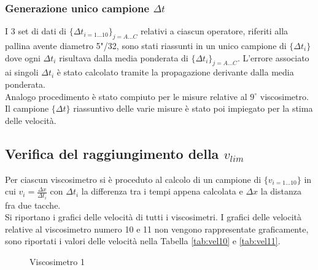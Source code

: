 \documentclass[a4paper,11pt,oneside]{article}
\begin{document}
\subsubsection*{Generazione unico campione $\Delta t$}
I 3 set di dati di $\{\Delta t_{i=1\dots10}\}_{j=A \dots C}$ relativi a ciascun operatore, riferiti alla pallina avente diametro 5"/32, sono stati riassunti in un unico campione di $\{\Delta t_{i}\}$ dove ogni $\Delta t_{i}$ risultava dalla media ponderata di $\{\Delta t_{i}\}_{j=A \dots C}$. L'errore associato ai singoli ${\Delta t_{i}}$ è stato calcolato tramite la propagazione derivante dalla media ponderata.\\

Analogo procedimento è stato compiuto per le misure relative al $9^{\circ}$ viscosimetro.
Il campione $\{\Delta t\}$ riassuntivo delle varie misure è stato poi impiegato per la stima delle velocità.


\subsection{Verifica del raggiungimento della $v_{lim}$}

Per ciascun viscosimetro si è proceduto al calcolo di un campione di $\{v_{i=1\dots 10}\}$ in cui $v_{i} = \frac{\Delta x}{\Delta t_i}$ con $\Delta t_i$ la differenza tra i tempi appena calcolata e $\Delta x$ la distanza fra due tacche.\\
Si riportano i grafici delle velocità di tutti i viscosimetri. I grafici delle velocità relative al viscosimetro numero 10 e 11 non vengono rappresentate graficamente, sono riportati i valori delle velocità nella Tabella \ref{tab:vel10} e \ref{tab:vel11}.

\begin{figure}[h!]
    \centering
    \caption{Viscosimetro 1}
\end{figure}
\end{document}
